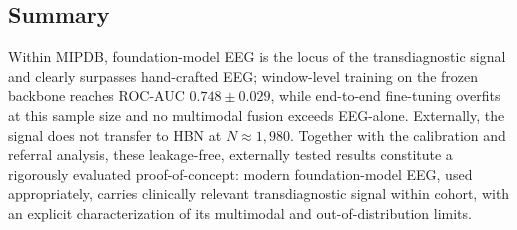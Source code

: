\subsection{Summary}
Within MIPDB, foundation-model EEG is the locus of the transdiagnostic signal and
clearly surpasses hand-crafted EEG; window-level training on the frozen backbone
reaches ROC-AUC $0.748 \pm 0.029$, while end-to-end fine-tuning overfits at this
sample size and no multimodal fusion exceeds EEG-alone. Externally, the signal does
not transfer to HBN at $N \approx 1{,}980$. Together with the calibration and
referral analysis, these leakage-free, externally tested results constitute a
rigorously evaluated proof-of-concept: modern foundation-model EEG, used
appropriately, carries clinically relevant transdiagnostic signal within cohort, with
an explicit characterization of its multimodal and out-of-distribution limits.
